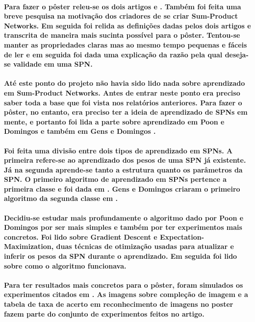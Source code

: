 \documentclass[a4paper,10pt]{article}
\theoremstyle{plain}
\begin{document}
\paragraph{
  Para fazer o pôster releu-se os dois artigos \cite{poon-domingos} e \cite{gens-domingos}. Também
  foi feita uma breve pesquisa na motivação dos criadores de se criar Sum-Product Networks. Em
  seguida foi relida as definições dadas pelos dois artigos e transcrita de maneira mais sucinta
  possível para o pôster. Tentou-se manter as propriedades claras mas ao mesmo tempo pequenas e
  fáceis de ler e em seguida foi dada uma explicação da razão pela qual deseja-se validade em uma
  SPN.
}

\paragraph{
  Até este ponto do projeto não havia sido lido nada sobre aprendizado em Sum-Product Networks.
  Antes de entrar neste ponto era preciso saber toda a base que foi vista nos relatórios
  anteriores. Para fazer o pôster, no entanto, era preciso ter a ideia de aprendizado de SPNs em
  mente, e portanto foi lida a parte sobre aprendizado em Poon e Domingos \cite{poon-domingos} e
  também em Gens e Domingos \cite{gens-domingos}.
}

\paragraph{
  Foi feita uma divisão entre dois tipos de aprendizado em SPNs. A primeira refere-se ao
  aprendizado dos pesos de uma SPN já existente. Já na segunda aprende-se tanto a estrutura quanto
  os parâmetros da SPN. O primeiro algoritmo de aprendizado em SPNs pertence a primeira classe e
  foi dada em \cite{poon-domingos}. Gens e Domingos criaram o primeiro algoritmo da segunda classe
  em \cite{gens-domingos}.
}

\paragraph{
  Decidiu-se estudar mais profundamente o algoritmo dado por Poon e Domingos por ser mais simples
  e também por ter experimentos mais concretos. Foi lido sobre Gradient Descent e
  Expectation-Maximization, duas técnicas de otimização usadas para atualizar e inferir os pesos
  da SPN durante o aprendizado. Em seguida foi lido sobre como o algoritmo funcionava.
}

\paragraph{
  Para ter resultados mais concretos para o pôster, foram simulados os experimentos citados em
  \cite{poon-domingos}. As imagens sobre compleção de imagem e a tabela de taxa de acerto em
  reconhecimento de imagens no poster fazem parte do conjunto de experimentos feitos no artigo.
}
\end{document}
